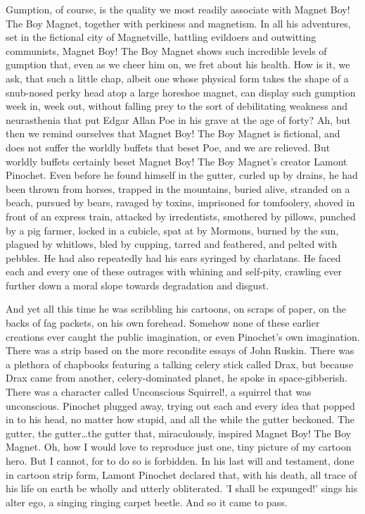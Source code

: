 Gumption, of course, is the quality we most readily associate with Magnet Boy! The Boy Magnet, together with perkiness and magnetism. In all his adventures, set in the fictional city of Magnetville, battling evildoers and outwitting communists, Magnet Boy! The Boy Magnet shows such incredible levels of gumption that, even as we cheer him on, we fret about his health. How is it, we ask, that such a little chap, albeit one whose physical form takes the shape of a snub-nosed perky head atop a large horeshoe magnet, can display such gumption week in, week out, without falling prey to the sort of debilitating weakness and neurasthenia that put Edgar Allan Poe in his grave at the age of forty? Ah, but then we remind ourselves that Magnet Boy! The Boy Magnet is fictional, and does not suffer the worldly buffets that beset Poe, and we are relieved. But worldly buffets certainly beset Magnet Boy! The Boy Magnet's creator Lamont Pinochet. Even before he found himself in the gutter, curled up by drains, he had been thrown from horses, trapped in the mountains, buried alive, stranded on a beach, pursued by bears, ravaged by toxins, imprisoned for tomfoolery, shoved in front of an express train, attacked by irredentists, smothered by pillows, punched by a pig farmer, locked in a cubicle, spat at by Mormons, burned by the sun, plagued by whitlows, bled by cupping, tarred and feathered, and pelted with pebbles. He had also repeatedly had his ears syringed by charlatans. He faced each and every one of these outrages with whining and self-pity, crawling ever further down a moral slope towards degradation and disgust.

And yet all this time he was scribbling his cartoons, on scraps of paper, on the backs of fag packets, on his own forehead. Somehow none of these earlier creations ever caught the public imagination, or even Pinochet's own imagination. There was a strip based on the more recondite essays of John Ruskin. There was a plethora of chapbooks featuring a talking celery stick called Drax, but because Drax came from another, celery-dominated planet, he spoke in space-gibberish. There was a character called Unconscious Squirrel!, a squirrel that was unconscious. Pinochet plugged away, trying out each and every idea that popped in to his head, no matter how stupid, and all the while the gutter beckoned. The gutter, the gutter\ldots the gutter that, miraculously, inspired Magnet Boy! The Boy Magnet. Oh, how I would love to reproduce just one, tiny picture of my cartoon hero. But I cannot, for to do so is forbidden. In his last will and testament, done in cartoon strip form, Lamont Pinochet declared that, with his death, all trace of his life on earth be wholly and utterly obliterated. 'I shall be expunged!' sings his alter ego, a singing ringing carpet beetle. And so it came to pass.

